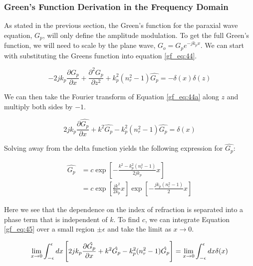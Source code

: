 \subsubsection {Green's Function Derivation in the Frequency Domain} \label{gf_sec:paraxial_gf_derivation}
As stated in the previous section, the Green's function for the paraxial wave equation, $G_p$, will only define the amplitude modulation. To get the full Green's function, we will need to scale by the plane wave, $G_o= G_p e^{-jk_px}$. We can start with substituting the Greens function into equation \ref{gf_eq:44}.

\begin{equation}
-2jk_p\frac{\partial G_p}{\partial x} + \frac{\partial^2 G_p}{\partial z^2} +k_p^2(n_r^2-1)\hat{G_p}= -\delta(x)\delta(z)
\label{gf_eq:44a}
\end{equation}
 \renewcommand{\baselinestretch}{2} \small\normalsize
 
We can then take the Fourier transform of Equation \ref{gf_eq:44a} along $z$ and multiply both sides by $-1$.

\begin{equation}
2jk_p\frac{\partial \hat{G_p}}{\partial x} +k^2\hat{G_p} -k_p^2(n_r^2-1)\hat{G_p}= \delta(x)
\label{gf_eq:45}
\end{equation}
 \renewcommand{\baselinestretch}{2} \small\normalsize
 
Solving away from the delta function yields the following expression for $\hat{G_p}$:

\begin{equation}
\begin{aligned}
\hat{G_p}&=c\exp\left[-\frac{k^2 - k_p^2(n_r^2-1)}{2jk_p}x \right]\\
&= c\exp\left[\frac{jk^2}{2k_p}x \right] \exp\left[-\frac{jk_p(n_r^2-1)}{2}x\right]
\end{aligned}
\label{gf_eq:46}
\end{equation}
 \renewcommand{\baselinestretch}{2} \small\normalsize
 
Here we see that the dependence on the index of refraction is separated into a phase term that is independent of $k$. To find $c$, we can integrate Equation \ref{gf_eq:45} over a small region $\pm\epsilon$ and take the limit as $x\rightarrow 0$.

\begin{equation}
\lim_{x\rightarrow 0}\int_{-\epsilon}^{\epsilon}dx\left[2jk_p\frac{\partial\hat{G_p}}{\partial x}+ k^2\hat{G_p} -k_p^2(n_r^2-1)\hat{G_p} \right] = \lim_{x\rightarrow 0}\int_{-\epsilon}^{\epsilon}dx\delta(x)\\
\label{gf_eq:47}
\end{equation}
 \renewcommand{\baselinestretch}{2} \small\normalsize
 
